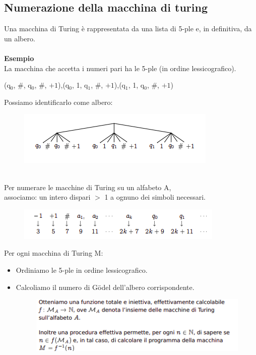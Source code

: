 \subsection{Numerazione della macchina di turing}
Una macchina di Turing è rappresentata da una lista di 5-ple e, in definitiva, da un albero.\\\\
\textbf{Esempio}\\
La macchina che accetta i numeri pari ha le 5-ple (in ordine lessicografico).\\
\begin{center}
    (q$_0$, \#, q$_0$, \#, $+1$),(q$_0$, 1, q$_1$, \#, $+1$),(q$_1$, 1, q$_0$, \#, $+1$)
\end{center}
Possiamo identificarlo come albero:
\begin{figure}[htp]
    \centering
     \includegraphics[scale=1]{tesi_stile/img/albero.png}
\end{figure}\\
Per numerare le macchine di Turing su un alfabeto A,\\ 
associamo: un intero dispari $>$ 1 a ognuno dei simboli necessari.\\
\begin{figure}[htp]
    \centering
     \includegraphics[scale=0.8]{tesi_stile/img/numeri.png}
\end{figure}
\newpage
Per ogni macchina di Turing M:
\begin{itemize}
    \item Ordiniamo le 5-ple in ordine lessicografico.
    
    \item Calcoliamo il numero di Gödel dell’albero corrispondente.\\
    \begin{figure}[htp]
        \centering
        \includegraphics[scale=0.9]{tesi_stile/img/sotto.png}
     
    \end{figure}
\end{itemize}
